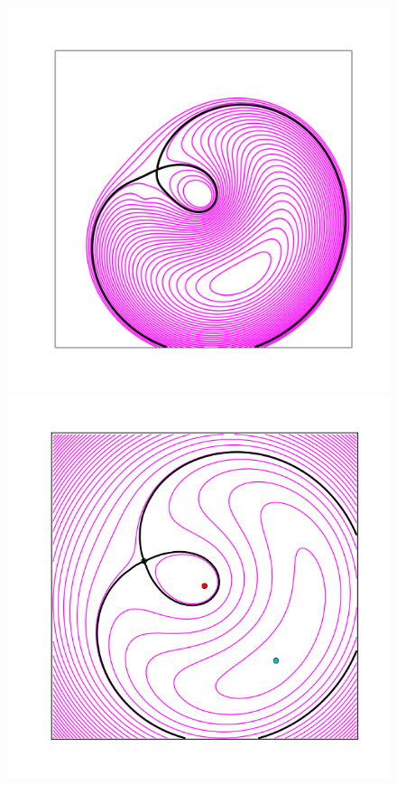 \begin{figure}
  \includegraphics[width=\myplotswidth]{fig/ASW000195x_006975_arriv.png}
  \includegraphics[width=\myplotswidth]{fig/006975_spaghetti} \\

\end{figure}
